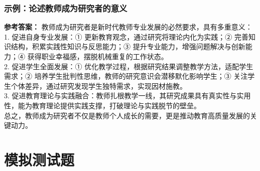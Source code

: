 \documentclass[12pt,a4paper]{article}
\begin{document}
\subsubsection{示例：论述教师成为研究者的意义}
\textbf{参考答案：}
教师成为研究者是新时代教师专业发展的必然要求，具有多重意义：\\
1. 促进自身专业发展：① 更新教育观念，通过研究将理论内化为实践；② 完善知识结构，积累实践性知识与反思能力；③ 提升专业能力，增强问题解决与创新能力；④ 获得职业幸福感，摆脱机械重复的工作状态。\\
2. 促进学生全面发展：① 优化教学过程，根据研究结果调整教学方法，适配学生需求；② 培养学生批判性思维，教师的研究意识会潜移默化影响学生；③ 关注学生个体差异，通过研究发现学生独特需求，实现因材施教。\\
3. 促进教育理论与实践融合：教师扎根教学一线，其研究成果具有真实性与实用性，能为教育理论提供实践支撑，打破理论与实践脱节的壁垒。\\
总之，教师成为研究者不仅是教师个人成长的需要，更是推动教育高质量发展的关键动力。



\section{模拟测试题}
\end{document}
